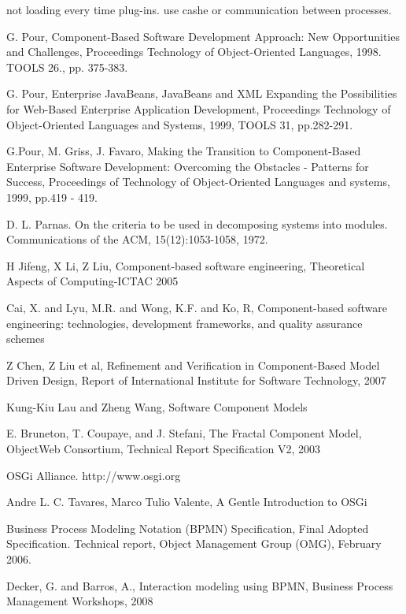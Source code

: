 not loading every time plug-ins. use cashe or communication between processes.

\begin{thebibliography}{99}

 G. Pour, Component-Based Software Development Approach: New Opportunities and Challenges, Proceedings Technology of Object-Oriented Languages, 1998. TOOLS 26., pp. 375-383.

  G. Pour,  Enterprise JavaBeans,  JavaBeans and XML Expanding the Possibilities for Web-Based Enterprise Application Development,  Proceedings Technology of Object-Oriented Languages and Systems, 1999, TOOLS 31, pp.282-291.

 G.Pour, M. Griss, J. Favaro, Making the Transition to Component-Based Enterprise Software Development: Overcoming the Obstacles - Patterns for Success, Proceedings of Technology of Object-Oriented Languages and systems, 1999, pp.419 - 419.

 D. L. Parnas. On the criteria to be used in decomposing systems into modules. Communications of the ACM, 15(12):1053-1058, 1972.

 H Jifeng, X Li, Z Liu, Component-based software engineering, Theoretical Aspects of Computing-ICTAC 2005

 Cai, X. and Lyu, M.R. and Wong, K.F. and Ko, R, Component-based software engineering: technologies, development frameworks, and quality assurance schemes

 Z Chen, Z Liu et al, Refinement and Verification in Component-Based Model Driven Design, Report of International Institute for Software Technology, 2007

 Kung-Kiu Lau and Zheng Wang, Software Component Models

 E. Bruneton, T. Coupaye, and J. Stefani, The Fractal Component Model, ObjectWeb Consortium, Technical Report Specification V2, 2003

 OSGi Alliance. http://www.osgi.org 

 Andre L. C. Tavares, Marco Tulio Valente, A Gentle Introduction to OSGi

 Business Process Modeling Notation (BPMN) Specification, Final Adopted Specification. Technical report, Object Management Group (OMG), February 2006.

 Decker, G. and Barros, A., Interaction modeling using BPMN, Business Process Management Workshops, 2008


\end{thebibliography}
